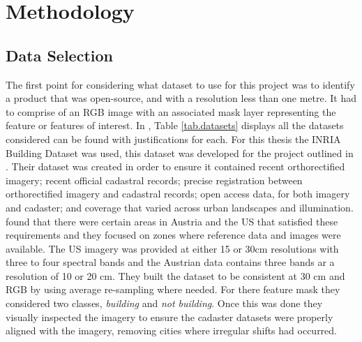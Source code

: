 \chapter{Methodology}

\section{Data Selection}
The first point for considering what dataset to use for this project was to identify a product that was open-source, and with a resolution less than one metre. It had to comprise of an RGB image with an associated mask layer representing the feature or features of interest. In \cite{Richmond19b}, Table \ref{tab.datasets} displays all the datasets considered can be found with justifications for each. For this thesis the INRIA Building Dataset was used, this dataset was developed for the project outlined in \cite{maggiori17a}. Their dataset was created in order to ensure it contained recent orthorectified imagery; recent official cadastral records; precise registration between orthorectified imagery and cadastral records; open access data, for both imagery and cadaster; and coverage that varied across urban landscapes and illumination. \cite{maggiori17a} found that there were certain areas in Austria and the US that satisfied these requirements and they focused on zones where reference data and images were available. The US imagery was provided at either 15 or 30cm resolutions with three to four spectral bands and the Austrian data contains three bands ar a resolution of 10 or 20 cm. They built the dataset to be consistent at 30 cm and RGB by using average re-sampling where needed. For there feature mask they considered two classes, \textit{building} and \textit{not building}. Once this was done they visually inspected the imagery to ensure the cadaster datasets were properly aligned with the imagery, removing cities where irregular shifts had occurred. 

